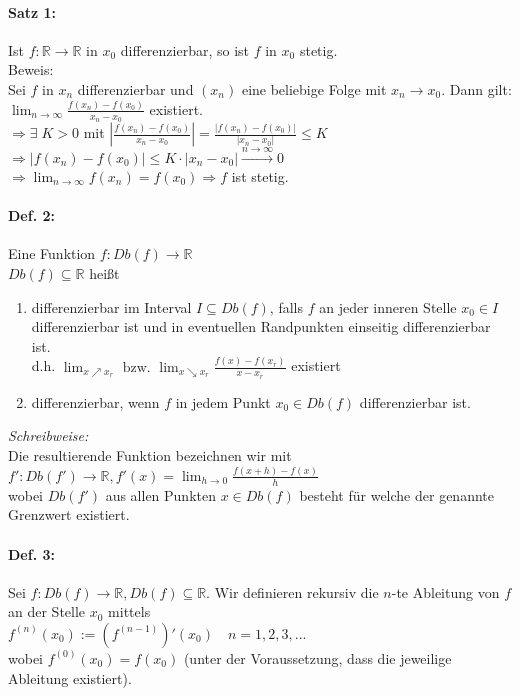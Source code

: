\paragraph{Satz 1:} Ist $f: \mathbb{R}\to \mathbb{R}$ in $x_0$ differenzierbar, so ist $f$ in $x_0$ stetig.\\
Beweis:\\
Sei $f$ in $x_n$ differenzierbar und $(x_n)$ eine beliebige Folge mit $x_n\to x_0$. Dann gilt:\\
$\lim_{n\to \infty}\frac{f(x_n)-f(x_0)}{x_n-x_0}$ existiert.\\
$\Rightarrow \exists\; K > 0$ mit $\left| \frac{f(x_n)-f(x_0)}{x_n-x_0} \right| = \frac{|f(x_n)-f(x_0)|}{|x_n-x_0|}\leq K$\\
$\Rightarrow |f(x_n) - f(x_0) | \leq K \cdot |x_n - x_0| \overset{n\to \infty}{\longrightarrow} 0$\\
$\Rightarrow \lim_{n\to \infty} f(x_n)=f(x_0) \Rightarrow f$ ist stetig.

\paragraph{Def. 2:} Eine Funktion $f: Db(f)\to \mathbb{R}$\\
$Db(f)\subseteq \mathbb{R}$ heißt
\begin{enumerate}[label=\alph*.)]
\item differenzierbar im Interval $I \subseteq Db(f)$, falls $f$ an jeder inneren Stelle $x_0\in I$ differenzierbar ist und in eventuellen Randpunkten einseitig differenzierbar ist.\\
d.h. $\lim_{x\nearrow x_r} \text{ bzw. } \lim_{x\searrow x_r} \frac{f(x)-f(x_r)}{x-x_r}$ existiert
\item differenzierbar, wenn $f$ in jedem Punkt $x_0 \in Db(f)$ differenzierbar ist.
\end{enumerate}
\emph{Schreibweise:}\\
Die resultierende Funktion bezeichnen wir mit \\
$f': Db(f')\to \mathbb{R}, f'(x)=\lim_{h\to 0} \frac{f(x+h)-f(x)}{h}$\\
wobei $Db(f')$ aus allen Punkten $x \in Db(f)$ besteht für welche der genannte Grenzwert existiert.

\paragraph{Def. 3:} Sei $f: Db(f) \to \mathbb{R}, Db(f) \subseteq \mathbb{R}$. Wir definieren rekursiv die $n$-te Ableitung von $f$ an der Stelle $x_0$ mittels\\
$f^{(n)}(x_0):= \left(f^{(n-1)}\right)'(x_0) \quad n=1,2,3,...$\\
wobei $f^{(0)}(x_0)=f(x_0)$ (unter der Voraussetzung, dass die jeweilige Ableitung existiert).

